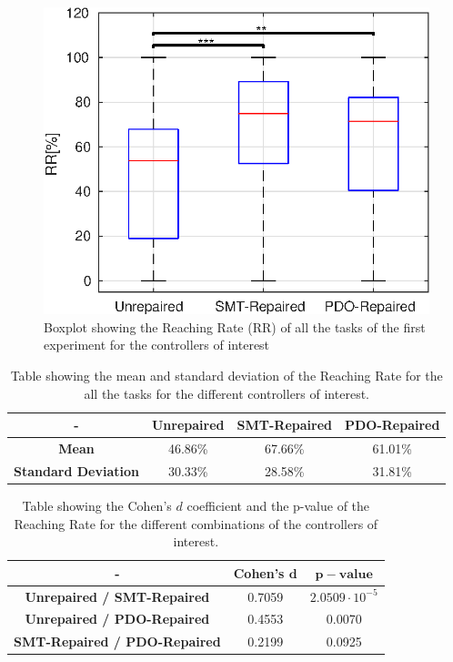 %
%
\begin{figure}[H]
    \centering
    \includegraphics[width=\textwidth]{Images/first-experiment/exp0_RR_all_box.eps}
    \caption{Boxplot showing the Reaching Rate (RR) of all the tasks of the first experiment for the controllers of interest}
    \label{fig:box-RR-all-first}
\end{figure}
\begin{table}[H]
    \centering
    \begin{tabular}{|c|c|c|c|}
        \hline
        - & \textbf{Unrepaired} & \textbf{SMT-Repaired} & \textbf{PDO-Repaired} \\
        \hline
        \textbf{Mean} & 46.86\% & 67.66\% & 61.01\% \\
        \textbf{Standard Deviation} & 30.33\% & 28.58\% & 31.81\% \\
        \hline
    \end{tabular}
    \caption{Table showing the mean and standard deviation of the Reaching Rate for the all the tasks for the different controllers of interest.}
    \label{tab:RR-all-first-mean-std}
\end{table}
\begin{table}[H]
    \centering
    \begin{tabular}{|c|c|c|}
        \hline
        - & \textbf{Cohen's} $\mathbf{d}$ & $\mathbf{p-value}$ \\
        \hline
        \textbf{Unrepaired / SMT-Repaired} & 0.7059 & $2.0509 \cdot 10^{-5}$ \\
        \textbf{Unrepaired / PDO-Repaired} & 0.4553 & 0.0070\\
        \textbf{SMT-Repaired / PDO-Repaired} & 0.2199 & 0.0925 \\
        \hline
    \end{tabular}
    \caption{Table showing the Cohen's $d$ coefficient and the p-value of the Reaching Rate for the different combinations of the controllers of interest.}
    \label{tab:RR-all-first-cohen-p}
\end{table}
